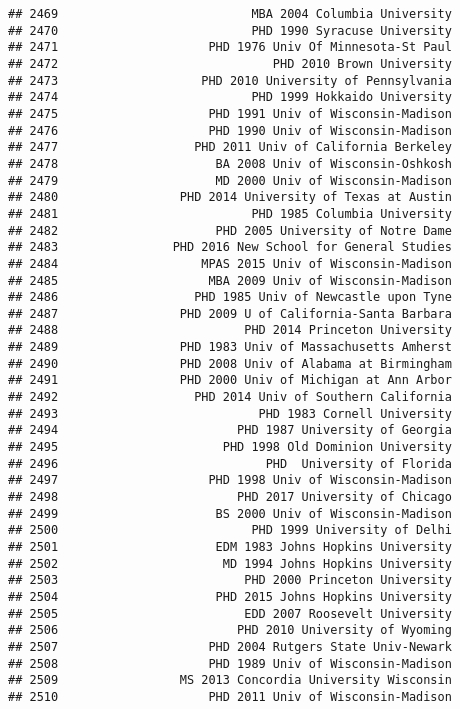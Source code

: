 \documentclass[
]{article}
\begin{document}
\begin{verbatim}
## 2469                           MBA 2004 Columbia University
## 2470                           PHD 1990 Syracuse University
## 2471                     PHD 1976 Univ Of Minnesota-St Paul
## 2472                              PHD 2010 Brown University
## 2473                    PHD 2010 University of Pennsylvania
## 2474                           PHD 1999 Hokkaido University
## 2475                     PHD 1991 Univ of Wisconsin-Madison
## 2476                     PHD 1990 Univ of Wisconsin-Madison
## 2477                   PHD 2011 Univ of California Berkeley
## 2478                      BA 2008 Univ of Wisconsin-Oshkosh
## 2479                      MD 2000 Univ of Wisconsin-Madison
## 2480                 PHD 2014 University of Texas at Austin
## 2481                           PHD 1985 Columbia University
## 2482                      PHD 2005 University of Notre Dame
## 2483                PHD 2016 New School for General Studies
## 2484                    MPAS 2015 Univ of Wisconsin-Madison
## 2485                     MBA 2009 Univ of Wisconsin-Madison
## 2486                   PHD 1985 Univ of Newcastle upon Tyne
## 2487                 PHD 2009 U of California-Santa Barbara
## 2488                          PHD 2014 Princeton University
## 2489                 PHD 1983 Univ of Massachusetts Amherst
## 2490                 PHD 2008 Univ of Alabama at Birmingham
## 2491                 PHD 2000 Univ of Michigan at Ann Arbor
## 2492                   PHD 2014 Univ of Southern California
## 2493                            PHD 1983 Cornell University
## 2494                         PHD 1987 University of Georgia
## 2495                       PHD 1998 Old Dominion University
## 2496                             PHD  University of Florida
## 2497                     PHD 1998 Univ of Wisconsin-Madison
## 2498                         PHD 2017 University of Chicago
## 2499                      BS 2000 Univ of Wisconsin-Madison
## 2500                           PHD 1999 University of Delhi
## 2501                      EDM 1983 Johns Hopkins University
## 2502                       MD 1994 Johns Hopkins University
## 2503                          PHD 2000 Princeton University
## 2504                      PHD 2015 Johns Hopkins University
## 2505                          EDD 2007 Roosevelt University
## 2506                         PHD 2010 University of Wyoming
## 2507                     PHD 2004 Rutgers State Univ-Newark
## 2508                     PHD 1989 Univ of Wisconsin-Madison
## 2509                 MS 2013 Concordia University Wisconsin
## 2510                     PHD 2011 Univ of Wisconsin-Madison

\end{verbatim}
\end{document}

